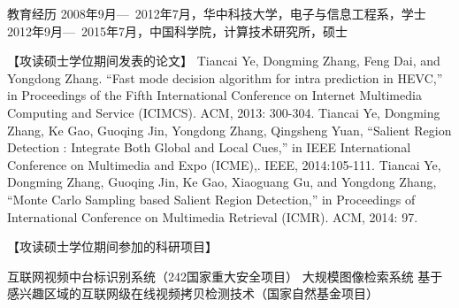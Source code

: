 
\begin{resume}

\begin{resumelist*}{教育经历}
\resumelistitem 2008年9月---~2012年7月，华中科技大学，电子与信息工程系，学士
\resumelistitem 2012年9月---~2015年7月，中国科学院，计算技术研究所，硕士
\end{resumelist*}

\begin{resumelist}{【攻读硕士学位期间发表的论文】}
\resumelistitem Tiancai Ye, Dongming Zhang, Feng Dai, and Yongdong Zhang. “Fast mode decision algorithm for intra prediction in HEVC,” in Proceedings of the Fifth International Conference on Internet Multimedia Computing and Service (ICIMCS). ACM, 2013: 300-304.
\resumelistitem Tiancai Ye, Dongming Zhang, Ke Gao, Guoqing Jin, Yongdong Zhang, Qingsheng Yuan, “Salient Region Detection : Integrate Both Global and Local Cues,” in IEEE International Conference on Multimedia and Expo (ICME),. IEEE, 2014:105-111.
\resumelistitem Tiancai Ye, Dongming Zhang, Guoqing Jin, Ke Gao, Xiaoguang Gu, and Yongdong Zhang, “Monte Carlo Sampling based Salient Region Detection,” in Proceedings of International Conference on Multimedia Retrieval (ICMR). ACM, 2014: 97.
\end{resumelist}

\begin{resumelist}{【攻读硕士学位期间参加的科研项目】}

\resumelistitem 互联网视频中台标识别系统（242国家重大安全项目）
\resumelistitem 大规模图像检索系统
\resumelistitem 基于感兴趣区域的互联网级在线视频拷贝检测技术（国家自然基金项目）

\end{resumelist}

\end{resume}
